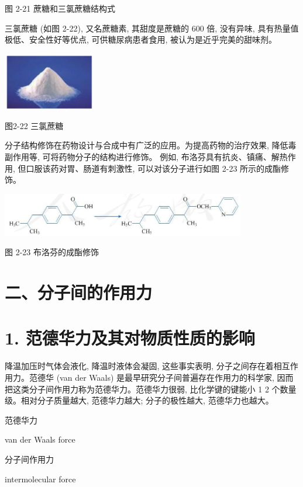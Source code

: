 \documentclass[10pt]{article}
\begin{document}
图 2-21 蔗糖和三氯蔗糖结构式

三氯蔗糖 (如图 2-22), 又名蔗糖素, 其甜度是蔗糖的 600 倍, 没有异味, 具有热量值极低、安全性好等优点, 可供糖尿病患者食用, 被认为是近乎完美的甜味剂。

\begin{center}
\includegraphics[max width=0.3\textwidth]{images/0190e026-5a11-7df7-bd27-54d09026ba7a_58_996313.jpg}
\end{center}

图2-22 三氯蔗糖

分子结构修饰在药物设计与合成中有广泛的应用。为提高药物的治疗效果, 降低毒副作用等, 可将药物分子的结构进行修饰。 例如, 布洛芬具有抗炎、镇痛、解热作用, 但口服该药对胃、肠道有刺激性, 可以对该分子进行如图 2-23 所示的成酯修饰。

\begin{center}
\includegraphics[max width=0.8\textwidth]{images/0190e026-5a11-7df7-bd27-54d09026ba7a_58_396057.jpg}
\end{center}

图 2-23 布洛芬的成酯修饰

\section*{二、分子间的作用力}

\section*{1. 范德华力及其对物质性质的影响}

降温加压时气体会液化, 降温时液体会凝固, 这些事实表明, 分子之间存在着相互作用力。范德华 (van der Waals) 是最早研究分子间普遍存在作用力的科学家, 因而把这类分子间作用力称为范德华力。范德华力很弱, 比化学键的键能小 1 2 个数量级。相对分子质量越大, 范德华力越大; 分子的极性越大, 范德华力也越大。

\begin{mdframed}

范德华力

van der Waals force

分子间作用力

intermolecular force

\end{mdframed}
\end{document}
